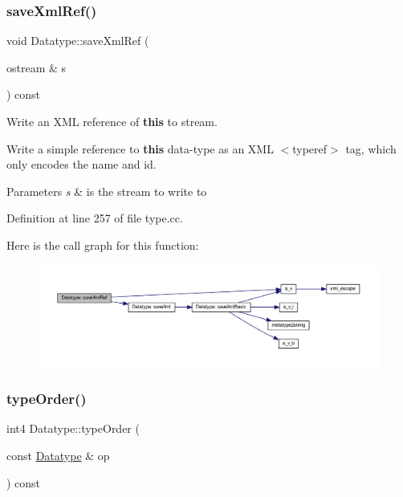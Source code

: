 \subsubsection{\texorpdfstring{saveXmlRef()}{saveXmlRef()}}
{\footnotesize\ttfamily void Datatype\+::save\+Xml\+Ref (\begin{DoxyParamCaption}\item[{ostream \&}]{s }\end{DoxyParamCaption}) const}



Write an X\+ML reference of {\bfseries{this}} to stream. 

Write a simple reference to {\bfseries{this}} data-\/type as an X\+ML $<$typeref$>$ tag, which only encodes the name and id. 
\begin{DoxyParams}{Parameters}
{\em s} & is the stream to write to \\
\hline
\end{DoxyParams}


Definition at line 257 of file type.\+cc.

Here is the call graph for this function\+:
\nopagebreak
\begin{figure}[H]
\begin{center}
\leavevmode
\includegraphics[width=350pt]{class_datatype_aa29b0b69af8ed3be7dc573e4a1e355a5_cgraph}
\end{center}
\end{figure}
\mbox{\label{class_datatype_a97e8ffb05266d744b2a63d20a76a9974}} 
\subsubsection{\texorpdfstring{typeOrder()}{typeOrder()}}
{\footnotesize\ttfamily int4 Datatype\+::type\+Order (\begin{DoxyParamCaption}\item[{const \mbox{\hyperlink{class_datatype}{Datatype}} \&}]{op }\end{DoxyParamCaption}) const\hspace{0.3cm}{\ttfamily [inline]}}



